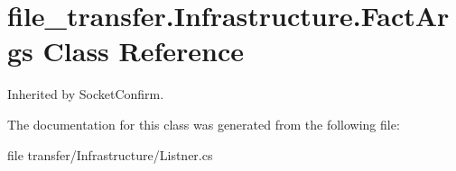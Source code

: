 \hypertarget{classfile__transfer_1_1_infrastructure_1_1_fact_args}{}\section{file\+\_\+transfer.\+Infrastructure.\+Fact\+Args Class Reference}
\label{classfile__transfer_1_1_infrastructure_1_1_fact_args}


Inherited by Socket\+Confirm.



The documentation for this class was generated from the following file\+:\begin{DoxyCompactItemize}
\item 
file transfer/\+Infrastructure/Listner.\+cs\end{DoxyCompactItemize}
